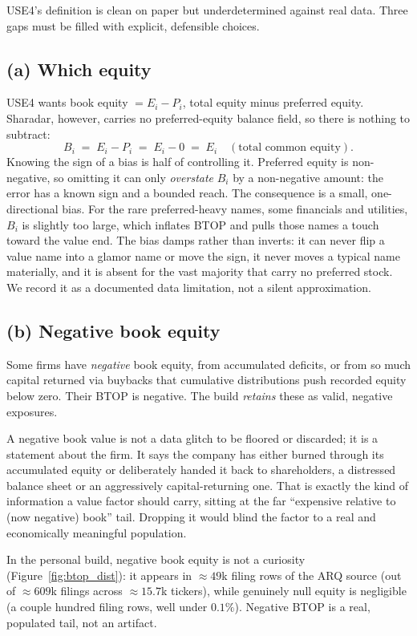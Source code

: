 \documentclass[11pt]{article}
\theoremstyle{definition}
\theoremstyle{plain}
\theoremstyle{remark}
\begin{document}
USE4's definition is clean on paper but underdetermined against real data. Three gaps must be filled with explicit, defensible choices.

\subsection*{(a) Which equity}
USE4 wants book equity $= E_i - P_i$, total equity minus preferred equity. Sharadar, however, carries no preferred-equity balance field, so there is nothing to subtract:
\[
  B_i \;=\; E_i - P_i \;=\; E_i - 0 \;=\; E_i \quad(\text{total common equity}).
\]
Knowing the sign of a bias is half of controlling it. Preferred equity is non-negative, so omitting it can only \emph{overstate} $B_i$ by a non-negative amount: the error has a known sign and a bounded reach. The consequence is a small, one-directional bias. For the rare preferred-heavy names, some financials and utilities, $B_i$ is slightly too large, which inflates BTOP and pulls those names a touch toward the value end. The bias damps rather than inverts: it can never flip a value name into a glamor name or move the sign, it never moves a typical name materially, and it is absent for the vast majority that carry no preferred stock. We record it as a documented data limitation, not a silent approximation.

\subsection*{(b) Negative book equity}
Some firms have \emph{negative} book equity, from accumulated deficits, or from so much capital returned via buybacks that cumulative distributions push recorded equity below zero. Their BTOP is negative. The build \emph{retains} these as valid, negative exposures.

\begin{intuition}
A negative book value is not a data glitch to be floored or discarded; it is a statement about the firm. It says the company has either burned through its accumulated equity or deliberately handed it back to shareholders, a distressed balance sheet or an aggressively capital-returning one. That is exactly the kind of information a value factor should carry, sitting at the far ``expensive relative to (now negative) book'' tail. Dropping it would blind the factor to a real and economically meaningful population.
\end{intuition}

\begin{observed}
In the personal build, negative book equity is not a curiosity (Figure~\ref{fig:btop_dist}): it appears in $\approx 49$k filing rows of the ARQ source (out of $\approx 609$k filings across $\approx 15.7$k tickers), while genuinely null equity is negligible (a couple hundred filing rows, well under $0.1\%$). Negative BTOP is a real, populated tail, not an artifact.
\end{observed}
\end{document}
